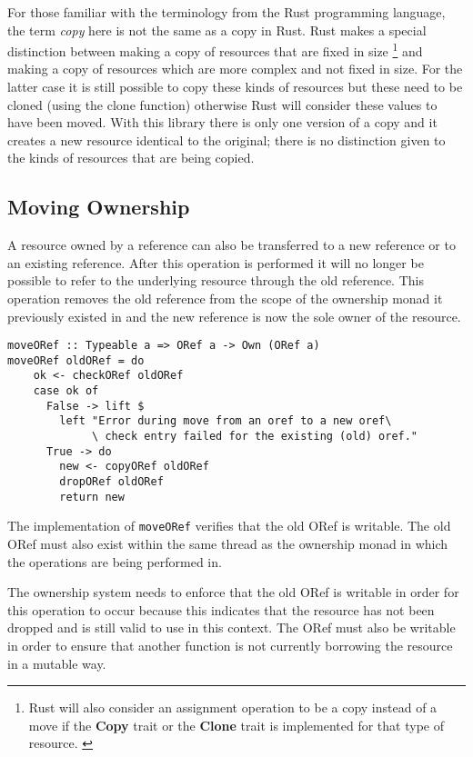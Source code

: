 \documentclass[onehalf,11pt]{beavtex}
\begin{document}
For those familiar with the terminology from the Rust programming language, the
term \textit{copy} here is not the same as a copy in Rust. Rust makes a special
distinction between making a copy of resources that are fixed in size
\footnote{Rust will also consider an assignment operation to be a copy instead
  of a move if the \textbf{Copy} trait or the \textbf{Clone} trait is
  implemented for that type of resource. \cite{rust_book_traits}
  \cite{rust_docs_clone_trait}}
and making a copy of resources which are more complex and not fixed in size.
For the latter case it is still possible to copy these kinds of resources but these
need to be cloned (using the clone function) otherwise Rust will consider these
values to have been moved. \cite{rust_book_ownership}
With this library there is only one version of a copy and it creates a new
resource identical to the original; there is no distinction given to the kinds
of resources that are being copied.

\subsection{Moving Ownership}

A resource owned by a reference can also be transferred to a new reference or
to an existing reference. After this operation is performed it will no longer
be possible to refer to the underlying resource through the old reference. This
operation removes the old reference from the scope of the ownership monad it
previously existed in and the new reference is now the sole owner of the
resource.

\begin{verbatim}
moveORef :: Typeable a => ORef a -> Own (ORef a)
moveORef oldORef = do
    ok <- checkORef oldORef
    case ok of
      False -> lift $
        left "Error during move from an oref to a new oref\
             \ check entry failed for the existing (old) oref."
      True -> do
        new <- copyORef oldORef
        dropORef oldORef
        return new
\end{verbatim}

The implementation of \texttt{moveORef} verifies that the old ORef is writable.
The old ORef must also exist within the same thread as the ownership monad in
which the operations are being performed in.

The ownership system needs to enforce that the old ORef is
writable in order for this operation to occur because this indicates that the
resource has not been dropped and is still valid to use in this context.
The ORef must also be writable in order to ensure that another function
is not currently borrowing the resource in a mutable way.
\end{document}
